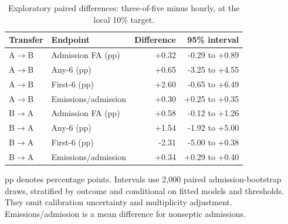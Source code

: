 \begin{table}[htbp]\centering\small
\caption{Exploratory paired differences: three-of-five minus hourly, at the local 10\% target.}\label{tab:paired}
\begin{tabular}{llrr}\toprule
Transfer & Endpoint & Difference & 95\% interval \\\midrule
A$\to$B & Admission FA (pp) & +0.32 & -0.29 to +0.89 \\
A$\to$B & Any-6 (pp) & +0.65 & -3.25 to +4.55 \\
A$\to$B & First-6 (pp) & +2.60 & -0.65 to +6.49 \\
A$\to$B & Emissions/admission & +0.30 & +0.25 to +0.35 \\
B$\to$A & Admission FA (pp) & +0.58 & -0.12 to +1.26 \\
B$\to$A & Any-6 (pp) & +1.54 & -1.92 to +5.00 \\
B$\to$A & First-6 (pp) & -2.31 & -5.00 to +0.38 \\
B$\to$A & Emissions/admission & +0.34 & +0.29 to +0.40 \\
\bottomrule\end{tabular}
\par\vspace{3pt}\begin{minipage}{.98\linewidth}\footnotesize pp denotes percentage points. Intervals use 2,000 paired admission-bootstrap draws, stratified by outcome and conditional on fitted models and thresholds. They omit calibration uncertainty and multiplicity adjustment. Emissions/admission is a mean difference for nonseptic admissions.\end{minipage}
\end{table}
